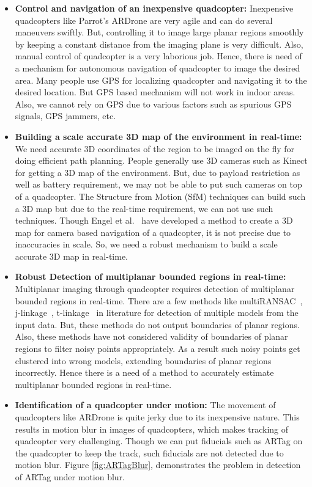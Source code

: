 \begin{itemize}
  \item \textbf{Control and navigation of an inexpensive quadcopter:}
  Inexpensive quadcopters like Parrot's ARDrone are very agile and can do
  several maneuvers swiftly. But, controlling it to image large planar regions
  smoothly by keeping a constant distance from the imaging plane is very
  difficult. Also, manual control of quadcopter is a very laborious job. Hence,
  there is need of a mechanism for autonomous navigation of quadcopter to image
  the desired area. Many people use GPS for localizing quadcopter and navigating
  it to the desired location. But GPS based mechanism will not work in indoor areas. 
  Also, we cannot rely on GPS due to various factors such as spurious GPS
  signals, GPS jammers, etc.
  
  \item \textbf{Building a scale accurate 3D map of the environment in
  real-time:} We need accurate 3D coordinates of the region to be imaged on the fly for
  doing efficient path planning. People generally use 3D cameras such as
  Kinect for getting a 3D map of the environment. But, due to payload
  restriction as well as battery requirement, we may not be able to put such
  cameras on top of a quadcopter. The Structure from Motion (SfM) techniques can
  build such a 3D map but due to the real-time requirement, we can not use such
  techniques. Though Engel et al.~\cite{engel} have developed a method to
  create a 3D map for camera based navigation of a quadcopter, it is not precise
  due to inaccuracies in scale. So, we need a
  robust mechanism to build a scale accurate 3D map in real-time.
  
  \item \textbf{Robust Detection of multiplanar bounded regions in real-time:} 
  Multiplanar imaging through quadcopter requires detection of multiplanar
  bounded regions in real-time. There are a few methods like
  multiRANSAC~\cite{zuliani}, j-linkage~\cite{jlinkage},
  t-linkage~\cite{tlinkage} in literature for detection of multiple models from
  the input data.  But, these methods do not output boundaries of planar
  regions. Also, these methods have not considered validity of boundaries of
  planar regions to  filter noisy points appropriately. As a result such noisy
  points get clustered into wrong models, extending boundaries of planar
  regions incorrectly. Hence there is a need of a method to accurately estimate
  multiplanar bounded regions in real-time.
  
  \item \textbf{Identification of a quadcopter under motion:}
  The movement of quadcopters like ARDrone is quite jerky due to its inexpensive
  nature. This results in motion blur in images of quadcopters, which makes
  tracking of quadcopter very challenging. Though we can put fiducials such as
  ARTag on the quadcopter to keep the track, such fiducials are not detected
  due to motion blur. Figure \ref{fig:ARTagBlur}, demonstrates the problem in
  detection of ARTag under motion blur.
  

\end{itemize}

